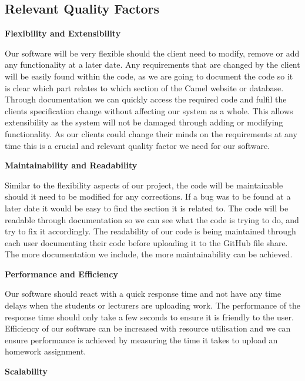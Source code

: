 		\newpage
    
	\subsection*{Relevant Quality Factors}
		\textbf{Flexibility and Extensibility}  

		Our software will be very flexible should the client need to modify, remove or add any functionality at a later date. Any requirements that are changed by the client will be easily found within the code, as we are going to document the code so it is clear which part relates to which section of the Camel website or database. Through documentation we can quickly access the required code and fulfil the clients specification change without affecting our system as a whole. This allows extensibility as the system will not be damaged through adding or modifying functionality. As our clients could change their minds on the requirements at any time this is a crucial and relevant quality factor we need for our software. 

	    \textbf{Maintainability and Readability}   
    
		Similar to the flexibility aspects of our project, the code will be maintainable should it need to be modified for any corrections. If a bug was to be found at a later date it would be easy to find the section it is related to. The code will be readable through documentation so we can see what the code is trying to do, and try to fix it accordingly. The readability of our code is being maintained through each user documenting their code before uploading it to the GitHub file share. The more documentation we include, the more maintainability can be achieved.

		\textbf{Performance and Efficiency} 
    
		Our software should react with a quick response time and not have any time delays when the students or lecturers are uploading work. The performance of the response time should only take a few seconds to ensure it is friendly to the user. Efficiency of our software can be increased with resource utilisation and we can ensure performance is achieved by measuring the time it takes to upload an homework assignment. 
    
	    \textbf{Scalability}   
    

